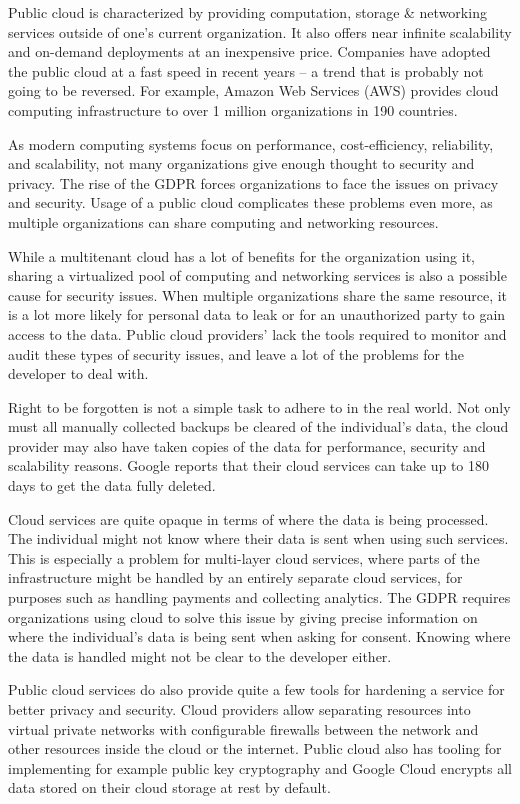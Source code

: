 Public cloud is characterized by providing computation, storage \& networking services outside of one's current organization.
It also offers near infinite scalability and on-demand deployments at an inexpensive price.
Companies have adopted the public cloud at a fast speed in recent years – a trend that is probably not going to be reversed.
For example, Amazon Web Services (AWS) provides cloud computing infrastructure to over 1 million organizations in 190 countries.
\cite{sevensins}

As modern computing systems focus on performance, cost-efficiency, reliability, and scalability, not many organizations give enough thought to security and privacy.
The rise of the GDPR forces organizations to face the issues on privacy and security.
Usage of a public cloud complicates these problems even more, as multiple organizations can share computing and networking resources.
\cite{sevensins}

While a multitenant cloud has a lot of benefits for the organization using it, sharing a virtualized pool of computing and networking services is also a possible cause for security issues.
When multiple organizations share the same resource, it is a lot more likely for personal data to leak or for an unauthorized party to gain access to the data.
Public cloud providers' lack the tools required to monitor and audit these types of security issues, and leave a lot of the problems for the developer to deal with.
\cite{cloudauditing}

Right to be forgotten is not a simple task to adhere to in the real world.
Not only must all manually collected backups be cleared of the individual's data, the cloud provider may also have taken copies of the data for performance, security and scalability reasons.
Google reports that their cloud services can take up to 180 days to get the data fully deleted.
\cite{sevensins}

Cloud services are quite opaque in terms of where the data is being processed.
The individual might not know where their data is sent when using such services.
This is especially a problem for multi-layer cloud services, where parts of the infrastructure might be handled by an entirely separate cloud services, for purposes such as handling payments and collecting analytics.
The GDPR requires organizations using cloud to solve this issue by giving precise information on where the individual's data is being sent when asking for consent.
Knowing where the data is handled might not be clear to the developer either.
\cite{sevensins}

Public cloud services do also provide quite a few tools for hardening a service for better privacy and security.
Cloud providers allow separating resources into virtual private networks with configurable firewalls between the network and other resources inside the cloud or the internet.
Public cloud also has tooling for implementing for example public key cryptography and Google Cloud encrypts all data stored on their cloud storage at rest by default. 
\cite{googlecloud}
